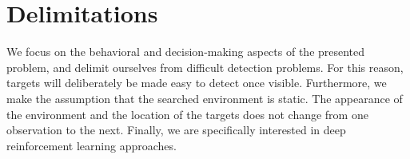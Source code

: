 \section{Delimitations}
\label{sec:delimitations}


We focus on the behavioral and decision-making aspects of the presented problem, and delimit ourselves from difficult detection problems.
For this reason, targets will deliberately be made easy to detect once visible.
Furthermore, we make the assumption that the searched environment is static.
The appearance of the environment and the location of the targets does not change from one observation to the next.
Finally, we are specifically interested in deep reinforcement learning approaches.

